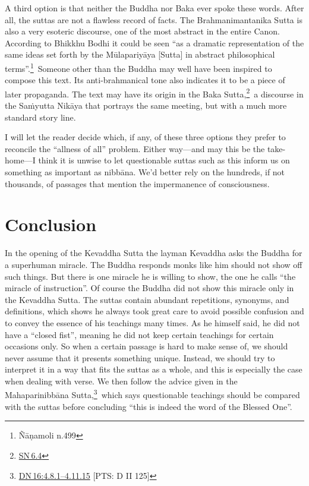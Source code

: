 \documentclass[10pt, openany]{book}
\begin{document}
A third option is that neither the Buddha nor Baka ever spoke these words. After all, the suttas are not a flawless record of facts. The Brahmanimantanika Sutta is also a very esoteric discourse, one of the most abstract in the entire Canon. According to Bhikkhu Bodhi it could be seen “as a dramatic representation of the same ideas set forth by the Mūlapariyāya [Sutta] in abstract philosophical terms”.\footnote {Ñāṇamoli n.499} Someone other than the Buddha may well have been inspired to compose this text. Its anti-brahmanical tone also indicates it to be a piece of later propaganda. The text may have its origin in the Baka Sutta,\footnote {\href{https://suttacentral.net/sn6.4/en/sujato}{SN 6.4}} a discourse in the Saṁyutta Nikāya that portrays the same meeting, but with a much more standard story line.


I will let the reader decide which, if any, of these three options they prefer to reconcile the “allness of all” problem. Either way—and may this be the take-home—I think it is unwise to let questionable suttas such as this inform us on something as important as nibbāna. We’d better rely on the hundreds, if not thousands, of passages that mention the impermanence of consciousness.


\chapter{Conclusion}
In the opening of the Kevaddha Sutta the layman Kevaddha asks the Buddha for a superhuman miracle. The Buddha responds monks like him should not show off such things. But there is one miracle he is willing to show, the one he calls “the miracle of instruction”. Of course the Buddha did not show this miracle only in the Kevaddha Sutta. The suttas contain abundant repetitions, synonyms, and definitions, which shows he always took great care to avoid possible confusion and to convey the essence of his teachings many times. As he himself said, he did not have a “closed fist”, meaning he did not keep certain teachings for certain occasions only. So when a certain passage is hard to make sense of, we should never assume that it presents something unique. Instead, we should try to interpret it in a way that fits the suttas as a whole, and this is especially the case when dealing with verse. We then follow the advice given in the Mahaparinibbāna Sutta,\footnote {\href{https://suttacentral.net/dn16/en/sujato\#4.8.1}{DN 16:4.8.1–4.11.15} [PTS: D II 125]} which says questionable teachings should be compared with the suttas before concluding “this is indeed the word of the Blessed One”.
\end{document}
